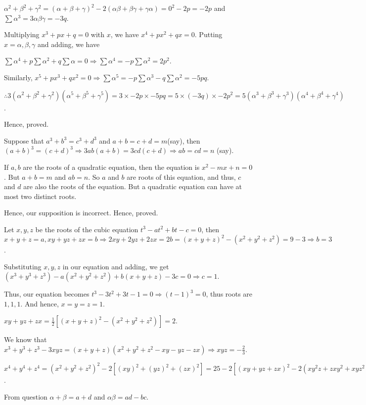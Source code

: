   $\alpha^2 + \beta^2 + \gamma^2 = (\alpha + \beta + \gamma)^2 - 2(\alpha\beta + \beta\gamma + \gamma\alpha)
  = 0^2 - 2p = -2p$ and $\sum\alpha^3 = 3\alpha\beta\gamma = -3q$.

  Multiplying $x^3 + px + q = 0$ with $x$, we have $x^4 + px^2 + qx = 0$. Putting $x = \alpha, \beta,
  \gamma$ and adding, we have

  $\sum\alpha^4 + p\sum\alpha^2 + q\sum\alpha = 0 \Rightarrow \sum\alpha^4 = -p\sum\alpha^2 = 2p^2$.

  Similarly, $x^5 + px^3 + qx^2 = 0 \Rightarrow \sum\alpha^5 = -p\sum\alpha^3 -
  q\sum\alpha^2 = -5pq$.

  $\therefore 3(\alpha^2 + \beta^2 + \gamma^2)(\alpha^5 + \beta^5 + \gamma^5) =
  3\times-2p\times-5pq =
  5\times(-3q)\times-2p^2 = 5(\alpha^3 + \beta^3 + \gamma^3)(\alpha^4 + \beta^4 + \gamma^4)$.

  Hence, proved.
\item Suppose that $a^3 + b^3 = c^3 + d^3$ and $a + b = c + d = m$(say), then $(a + b)^3 = (c + d)^3
  \Rightarrow 3ab(a + b) = 3cd(c + d) \Rightarrow ab = cd = n$ (say).

  If $a, b$ are the roots of a quadratic equation, then the equation is $x^2 - mx + n = 0$. But $a + b = m$
  and $ab = n$. So $a$ and $b$ are roots of this equation, and thus, $c$ and $d$ are also the roots of the
  equation. But a quadratic equation can have at most two distinct roots.

  Hence, our supposition is incorrect. Hence, proved.
\item Let $x, y, z$ be the roots of the cubic equation $t^3 - at^2 + bt - c = 0$, then $x + y + z = a, xy +
  yz + zx = b \Rightarrow 2xy + 2yz + 2zx = 2b = (x + y + z)^2 - (x^2 + y^2 + z^2) = 9 - 3 \Rightarrow b =
  3$.

  Substituting $x, y, z$ in our equation and adding, we get $(x^3 + y^3 + z^3) - a(x^2 + y^2 + z^2) + b(x +
  y + z) -3c = 0 \Rightarrow c = 1$.

  Thus, our equation becomes $t^3 - 3t^2 + 3t - 1 = 0 \Rightarrow (t - 1)^3 = 0$, thus roots are $1, 1,
  1$. And hence, $x = y = z = 1$.
\item $xy + yz + zx = \frac{1}{2}[(x + y + z)^2 - (x^2 + y^2 + z^2)] = 2$.

  We know that $x^3 + y^3 + z^3 - 3xyz = (x + y + z)(x^2 + y^2 + z^2 - xy - yz - zx)\Rightarrow xyz =
  -\frac{2}{3}$.

  $x^4 + y^4 + z^4 = (x^2 + y^2 + z^2)^2 - 2[(xy)^2 + (yz)^2 + (zx)^2] = 25 - 2[(xy + yz + zx)^2 - 2(xy^2z +
    zxy^2 + xyz^2)] = 25 - 2[4 - 2xyz(x + y + z)] = 9$.
\item From question $\alpha + \beta = a + d$ and $\alpha\beta = ad - bc$.

